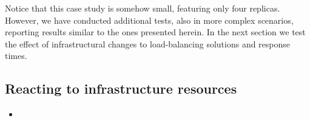 Notice that this case study is somehow small, featuring only four
replicas.  However, we have conducted additional tests, also in more
complex scenarios, reporting results similar to the ones presented
herein. In the next section we test the effect of infrastructural
changes to load-balancing solutions and response times.

\subsection{Reacting to infrastructure resources}

\begin{itemize}
\item {}
\end{itemize}

